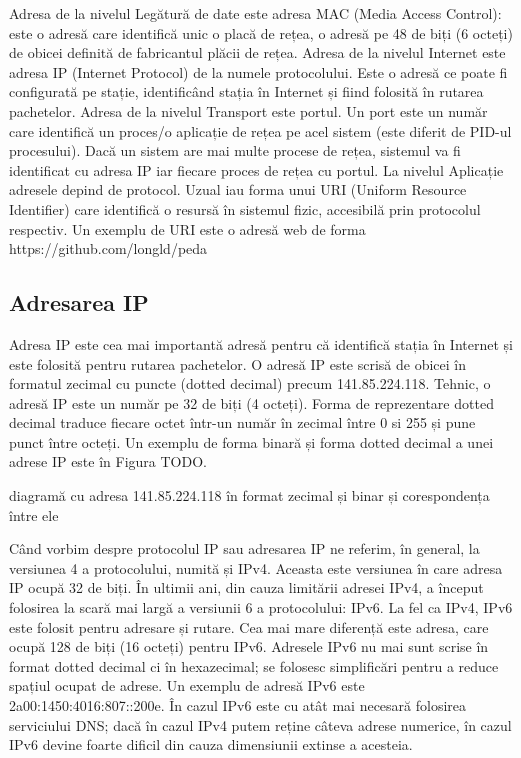 Adresa de la nivelul Legătură de date este adresa MAC (Media Access Control): este o adresă care identifică unic o placă de rețea, o adresă pe 48 de biți (6 octeți) de obicei definită de fabricantul plăcii de rețea.
Adresa de la nivelul Internet este adresa IP (Internet Protocol) de la numele protocolului. Este o adresă ce poate fi configurată pe stație, identificând stația în Internet și fiind folosită în rutarea pachetelor.
Adresa de la nivelul Transport este portul. Un port este un număr care identifică un proces/o aplicație de rețea pe acel sistem (este diferit de PID-ul procesului). Dacă un sistem are mai multe procese de rețea, sistemul va fi identificat cu adresa IP iar fiecare proces de rețea cu portul.
La nivelul Aplicație adresele depind de protocol. Uzual iau forma unui URI (Uniform Resource Identifier) care identifică o resursă în sistemul fizic, accesibilă prin protocolul respectiv. Un exemplu de URI este o adresă web de forma https://github.com/longld/peda

\subsection{Adresarea IP}
\label{sec:net:ip-address}

Adresa IP este cea mai importantă adresă pentru că identifică stația în Internet și este folosită pentru rutarea pachetelor. O adresă IP este scrisă de obicei în formatul zecimal cu puncte (dotted decimal) precum 141.85.224.118. Tehnic, o adresă IP este un număr pe 32 de biți (4 octeți). Forma de reprezentare dotted decimal traduce fiecare octet într-un număr în zecimal între 0 si 255 și pune punct între octeți. Un exemplu de forma binară și forma dotted decimal a unei adrese IP este în Figura TODO.

diagramă cu adresa 141.85.224.118 în format zecimal și binar și corespondența între ele

Când vorbim despre protocolul IP sau adresarea IP ne referim, în general, la versiunea 4 a protocolului, numită și IPv4. Aceasta este versiunea în care adresa IP ocupă 32 de biți. În ultimii ani, din cauza limitării adresei IPv4, a început folosirea la scară mai largă a versiunii 6 a protocolului: IPv6. La fel ca IPv4, IPv6 este folosit pentru adresare și rutare. Cea mai mare diferență este adresa, care ocupă 128 de biți (16 octeți) pentru IPv6. Adresele IPv6 nu mai sunt scrise în format dotted decimal ci în hexazecimal; se folosesc simplificări pentru a reduce spațiul ocupat de adrese. Un exemplu de adresă IPv6 este 2a00:1450:4016:807::200e. În cazul IPv6 este cu atât mai necesară folosirea serviciului DNS; dacă în cazul IPv4 putem reține câteva adrese numerice, în cazul IPv6 devine foarte dificil din cauza dimensiunii extinse a acesteia.

